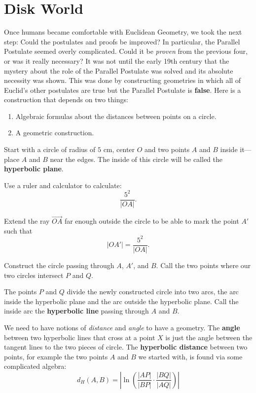 \newpage
\section{Disk World}	


Once humans became comfortable with Euclidean Geometry, we took the
next step: Could the postulates and proofs be improved? In particular,
the Parallel Postulate seemed overly complicated. Could it
be \textit{proven} from the previous four, or was it really necessary?
It was not until the early 19th century that the mystery about the
role of the Parallel Postulate was solved and its absolute necessity
was shown. This was done by constructing geometries in which all of
Euclid's other postulates are true but the Parallel Postulate
is \textbf{false}.  Here is a construction that depends on two things:
\begin{enumerate}
\item Algebraic formulas about the distances between points on a circle. 
\item A geometric construction.
\end{enumerate}

Start with a circle of radius of $5$ cm, center $O$ and two points $A$
and $B$ inside it---place $A$ and $B$ near the edges.  The inside of
this circle will be called the \textbf{hyperbolic plane}.

\begin{prob} 
Use a ruler and calculator to calculate:
\[
\frac{5^2}{|OA|}.
\]
\end{prob}

\begin{prob} 
Extend the ray $\vec{OA}$ far enough outside the circle to be able to mark the point $A'$ such that
\[
|OA'| = \frac{5^2}{|OA|}.
\]
\end{prob}

\begin{prob}
Construct the circle passing through $A$, $A'$, and $B$.  Call the two
points where our two circles intersect $P$ and $Q$. 
\end{prob}

The points $P$ and $Q$ divide the newly constructed circle into two
arcs, the arc inside the hyperbolic plane and the arc outside the
hyperbolic plane.  Call the inside arc the \textbf{hyperbolic line}
passing through $A$ and $B$.

We need to have notions of \textit{distance} and \textit{angle} to
have a geometry.  The \textbf{angle} between two hyperbolic lines that
cross at a point $X$ is just the angle between the tangent lines to
the two pieces of circle. The \textbf{hyperbolic distance} between two
points, for example the two points $A$ and $B$ we started with, is
found via some complicated algebra:
\[
d_H(A,B) = \left|\ln\left(\frac{|AP|}{|BP|} \cdot \frac{|BQ|}{|AQ|} \right)\right|
\]

